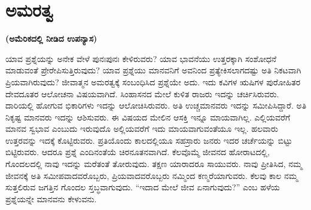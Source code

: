 \chapter{ಅಮರತ್ವ}%

\centerline{\textbf{(ಅಮೆರಿಕದಲ್ಲಿ ನೀಡಿದ ಉಪನ್ಯಾಸ)}}

ಯಾವ ಪ್ರಶ್ನೆಯನ್ನು ಅನೇಕ ವೇಳೆ ಪುನಃಪುನಃ ಕೇಳಿರುವರು? ಯಾವ ಭಾವನೆಯು ಉತ್ತರಕ್ಕಾಗಿ ಸಂಶೋಧನೆ ಮಾಡುವಂತೆ ಪ್ರೇರೇಪಿಸುತ್ತಿರುವುದು? ಯಾವ ಪ್ರಶ್ನೆಯು ಮಾನವನಿಗೆ ಅವನಿಂದ ಪ್ರತ್ಯೇಕಿಸಲಾಗದಷ್ಟು ಅತಿ ನಿಕಟವಾಗಿ ಪ್ರಿಯವಾಗಿರುವುದು? ಜೀವಾತ್ಮನ ಅಮರತ್ವಕ್ಕೆ ಸಂಬಂಧಿಸಿದ ಪ್ರಶ್ನೆಯೇ ಅದು. ಇದು ಕವಿಗಳ ಋಷಿಗಳ ಪುರೋಹಿತರ ದೇವದೂತರ ಆಲೋಚನಾ ವಿಷಯವಾಗಿದೆ. ಸಿಂಹಾಸನದ ಮೇಲೆ ಕುಳಿತ ರಾಜರು ಇದನ್ನು ಚರ್ಚಿಸಿರುವರು. ದಾರಿಯಲ್ಲಿ ಹೋಗುವ ಭಿಕಾರಿಗಳು ಇದನ್ನು ಆಲೋಚಿಸಿರುವರು. ಅತಿ ಉಚ್ಚಮಾನವರು ಇದನ್ನು ಸಮೀಪಿಸಿದ್ದಾರೆ. ಅತಿ ನಿಕೃಷ್ಟ ಮಾನವರು ಇದನ್ನು ಆಶಿಸುವರು. ಈ ವಿಷಯದ ಮೇಲಿನ ಆಸಕ್ತಿ ಇನ್ನೂ ಮಾಯವಾಗಿಲ್ಲ. ಎಲ್ಲಿಯವರೆಗೆ ಮಾನವ ಸ್ವಭಾವ ಎಂಬುದು ಇರುವುದೊ ಅಲ್ಲಿಯವರೆಗೆ ಇದು ಮಾಯವಾಗುವಂತೆಯೂ ಇಲ್ಲ. ಹಲವಾರು ಉತ್ತರವನ್ನು ಇದಕ್ಕೆ ಕೊಟ್ಟಿರುವರು. ಪ್ರತಿಯೊಂದು ಕಾಲದಲ್ಲಿಯೂ ಸಹಸ್ರಾರು ಜನರು ಇದರ ಚರ್ಚೆಯನ್ನು ಬಿಟ್ಟು ಬಿಟ್ಟಿರುವರು. ಆದರೂ ಪ್ರಶ್ನೆ ಎಂದಿನಂತೆಯೆ ಚಿರನೂತನವಾಗಿದೆ. ಕೆಲವೊಮ್ಮೆ ಜೀವನದ ಹೋರಾಟದಲ್ಲಿ, ಗೊಂದಲದಲ್ಲಿ ನಾವು ಇದನ್ನು ಮರೆತಂತೆ ತೋರುವುದು. ತಕ್ಷಣ ಯಾರಾದರೂ ಸಾಯುವರು. ನಾವು ಪ್ರೀತಿಸಿದ, ನಮ್ಮ ಜೀವನಕ್ಕೆ ಅತಿ ಸಮೀಪವಾದವರೊಬ್ಬರು, ಪ್ರಿಯವಾದವರೊಬ್ಬರು ನಮ್ಮಿಂದ ಕಣ್ಮರೆಯಾಗುವರು. ಕೆಲವು ಕಾಲ ನಮ್ಮ ಸುತ್ತಲಿರುವ ಜಗತ್ತಿನ ಗೊಂದಲ ಸ್ತಬ್ಧವಾಗುವುದು. “ಇದಾದ ಮೇಲೆ ಜೀವ ಏನಾಗುವುದು?” ಎಂಬ ಹಳೆಯ ಪ್ರಶ್ನೆಯನ್ನೇ ಮಾನವನು ಕೇಳುವನು.

